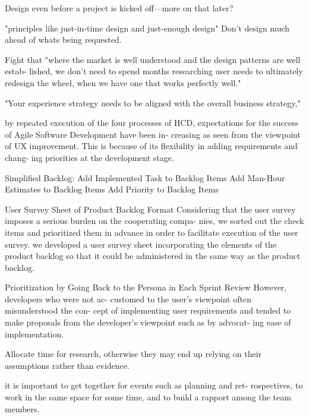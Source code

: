 Design even before a project is kicked off—more on that later?

"principles like just-in-time design and just-enough design" Don't design much ahead of whats being requested. \citep{ratcliffe2011agile:50}

Fight that "where the market is well understood and the design patterns are well estab- lished, we don’t need to spend months researching user needs to ultimately redesign the wheel, when we have one that works perfectly well." 
\citep{ratcliffe2011agile:51}

"Your experience strategy needs to be aligned with the overall business strategy," \citep{ratcliffe2011agile:53}



\citep{ratcliffe2011agile}

by repeated execution of the four processes of HCD, expectations for the success of Agile Software Development have been in- creasing as seen from the viewpoint of UX improvement. This is because of its flexibility in adding requirements and chang- ing priorities at the development stage.
\citep{nakao2014using}

Simplified Backlog: 
Add Implemented Task to Backlog Items
Add Man-Hour Estimates to Backlog Items
Add Priority to Backlog Items
\citep{nakao2014using}

User Survey Sheet of Product Backlog Format
Considering that the user survey imposes a serious burden on the cooperating compa- nies, we sorted out the check items and prioritized them in advance in order to facilitate execution of the user survey.
we developed a user survey sheet incorporating the elements of the product backlog so that it could be administered in the same way as the product backlog.
\citep{nakao2014using}

Prioritization by Going Back to the Persona in Each Sprint Review
However, developers who were not ac- customed to the user’s viewpoint often misunderstood the con- cept of implementing user requirements and tended to make proposals from the developer’s viewpoint such as by advocat- ing ease of implementation. 
\citep{nakao2014using}

Allocate time for research, otherwise they may end up relying on their assumptions rather than evidence. 
\citep{HowtoCom22:online}

it is important to get together for events such as planning and ret- rospectives, to work in the same space for some time, and to build a rapport among the team members.
\citep{Bringing52:online}

